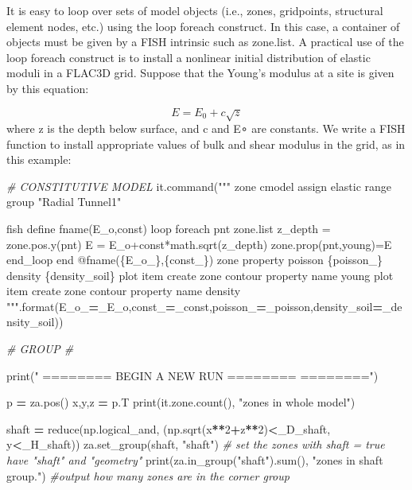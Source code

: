 \documentclass[a4paper, nobind]{templates/ociamthesis}
\newenvironment{Shaded}{\begin{snugshade}}{\end{snugshade}}
\newcommand{\BuiltInTok}[1]{#1}
\newcommand{\CommentTok}[1]{\textcolor[rgb]{0.56,0.35,0.01}{\textit{#1}}}
\newcommand{\DecValTok}[1]{\textcolor[rgb]{0.00,0.00,0.81}{#1}}
\newcommand{\NormalTok}[1]{#1}
\newcommand{\OperatorTok}[1]{\textcolor[rgb]{0.81,0.36,0.00}{\textbf{#1}}}
\newcommand{\SpecialCharTok}[1]{\textcolor[rgb]{0.00,0.00,0.00}{#1}}
\newcommand{\StringTok}[1]{\textcolor[rgb]{0.31,0.60,0.02}{#1}}
\renewenvironment{Shaded}
{
  \vspace{10pt}%
  \begin{snugshade}%
}{%
  \end{snugshade}%
  \vspace{8pt}%
}
\begin{document}
It is easy to loop over sets of model objects (i.e., zones, gridpoints, structural element nodes, etc.) using the loop foreach construct. In this case, a container of objects must be given by a FISH intrinsic such as zone.list. A practical use of the loop foreach construct is to install a nonlinear initial distribution of elastic moduli in a FLAC3D grid. Suppose that the Young's modulus at a site is given by this equation:

\[ E = E_0 + c \sqrt{z}  \] where z is the depth below surface, and c
and E∘ are constants. We write a FISH function to install appropriate
values of bulk and shear modulus in the grid, as in this example:

\begin{Shaded}
\begin{Highlighting}[]
\CommentTok{\# CONSTITUTIVE MODEL}
\NormalTok{it.command(}\StringTok{"""}
\StringTok{zone cmodel assign elastic range group "Radial Tunnel1"}

\StringTok{fish define fname(E\_o,const)}
\StringTok{loop foreach pnt zone.list}
\StringTok{z\_depth = zone.pos.y(pnt)}
\StringTok{E = E\_o+const*math.sqrt(z\_depth)}
\StringTok{zone.prop(pnt,\textquotesingle{}young\textquotesingle{})=E}
\StringTok{end\_loop}
\StringTok{end}
\StringTok{@fname(}\SpecialCharTok{\{E\_o\_\}}\StringTok{,}\SpecialCharTok{\{const\_\}}\StringTok{)}
\StringTok{zone property poisson }\SpecialCharTok{\{poisson\_\}}\StringTok{ density }\SpecialCharTok{\{density\_soil\}}
\StringTok{plot item create zone contour property name \textquotesingle{}young\textquotesingle{}}
\StringTok{plot item create zone contour property name \textquotesingle{}density\textquotesingle{}}
\StringTok{"""}\NormalTok{.}\BuiltInTok{format}\NormalTok{(E\_o\_}\OperatorTok{=}\NormalTok{\_E\_o,const\_}\OperatorTok{=}\NormalTok{\_const,poisson\_}\OperatorTok{=}\NormalTok{\_poisson,density\_soil}\OperatorTok{=}\NormalTok{\_density\_soil))}

\CommentTok{\# GROUP \#}

\BuiltInTok{print}\NormalTok{(}\StringTok{"               ======== BEGIN A NEW RUN ========        ========"}\NormalTok{)}

\NormalTok{p }\OperatorTok{=}\NormalTok{ za.pos()}
\NormalTok{x,y,z }\OperatorTok{=}\NormalTok{ p.T}
\BuiltInTok{print}\NormalTok{(it.zone.count(), }\StringTok{"zones in whole model"}\NormalTok{)}

\NormalTok{shaft }\OperatorTok{=} \BuiltInTok{reduce}\NormalTok{(np.logical\_and, (np.sqrt(x}\OperatorTok{**}\DecValTok{2}\OperatorTok{+}\NormalTok{z}\OperatorTok{**}\DecValTok{2}\NormalTok{)}\OperatorTok{\textless{}}\NormalTok{\_D\_shaft, y}\OperatorTok{\textless{}}\NormalTok{\_H\_shaft))}
\NormalTok{za.set\_group(shaft, }\StringTok{"shaft"}\NormalTok{) }\CommentTok{\# set the zones with shaft = true have "shaft" and "geometry"}
\BuiltInTok{print}\NormalTok{(za.in\_group(}\StringTok{"shaft"}\NormalTok{).}\BuiltInTok{sum}\NormalTok{(), }\StringTok{"zones in shaft group."}\NormalTok{) }\CommentTok{\#output how many zones are in the corner group}


\end{Highlighting}
\end{Shaded}
\end{document}
